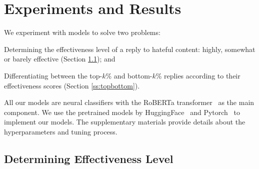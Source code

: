 \documentclass[11pt]{article}
\begin{document}
\section{Experiments and Results} 
\label{s:experiments}

We experiment with models to solve two problems:
\begin{compactitem}
	\item Determining the effectiveness level of a reply to hateful content: highly, somewhat or barely effective (Section \ref{ss:levels}); and
	\item Differentiating between the top-$k$\% and bottom-$k$\% replies according to their effectiveness scores (Section \ref{ss:topbottom}).
\end{compactitem}



All our models are neural classifiers with the RoBERTa transformer~\cite{DBLP:journals/corr/abs-1907-11692} as the main component.
We use the pretrained models by HuggingFace~\cite{wolf-etal-2020-transformers}
and Pytorch~\cite{NEURIPS2019_9015} to implement our models.
The supplementary materials provide details about the hyperparameters and tuning process.

\subsection{Determining Effectiveness Level}
\label{ss:levels}
\end{document}
